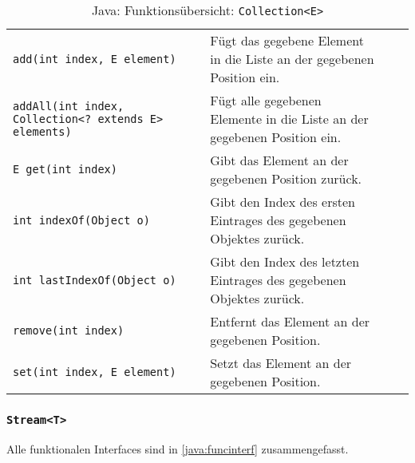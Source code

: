 \begin{sidewaystable}
\begin{tabular}{l | p{8cm} | c | c}
					\texttt{add(int index, E element)}                           & Fügt das gegebene Element in die Liste an der gegebenen Position ein.    & \texttimes &            \\
					\texttt{addAll(int index, Collection<? extends E> elements)} & Fügt alle gegebenen Elemente in die Liste an der gegebenen Position ein. & \texttimes &            \\
					\texttt{E get(int index)}                                    & Gibt das Element an der gegebenen Position zurück.                       & \texttimes &            \\
					\texttt{int indexOf(Object o)}                               & Gibt den Index des ersten Eintrages des gegebenen Objektes zurück.       & \texttimes &            \\
					\texttt{int lastIndexOf(Object o)}                           & Gibt den Index des letzten Eintrages des gegebenen Objektes zurück.      & \texttimes &            \\
					\texttt{remove(int index)}                                   & Entfernt das Element an der gegebenen Position.                          & \texttimes &            \\
					\texttt{set(int index, E element)}                           & Setzt das Element an der gegebenen Position.                             & \texttimes &            \\
				\end{tabular}
				\caption{Java: Funktionsübersicht: \texttt{Collection<E>}}
			\end{sidewaystable}


		\subsubsection{\texttt{Stream<T>}}
			Alle funktionalen Interfaces sind in \ref{java:funcinterf} zusammengefasst.

